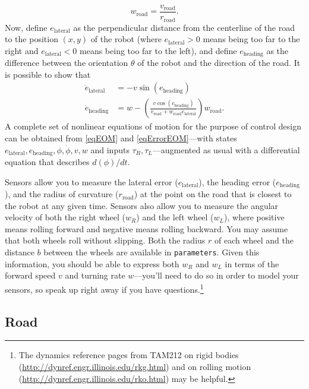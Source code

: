 \documentclass[12pt]{article}
\begin{document}
\begin{equation}
\label{eqCurvature}
w_\text{road} = \frac{v_\text{road}}{r_\text{road}}.
\end{equation}
Now, define $e_\text{lateral}$ as the perpendicular distance from the centerline of the road to the position $(x,y)$ of the robot (where $e_\text{lateral}>0$ means being too far to the right and $e_\text{lateral}<0$ means being too far to the left), and define $e_\text{heading}$ as the difference between the orientation $\theta$ of the robot and the direction of the road. It is possible to show that
\begin{equation}
\label{eqErrorEOM}
\begin{aligned}
\dot{e}_\text{lateral} &= -v\sin\left(e_\text{heading}\right) \\
\dot{e}_\text{heading} &= w-\left(\frac{v\cos\left(e_\text{heading}\right)}{v_\text{road}+w_\text{road}e_\text{lateral}}\right)w_\text{road}.
\end{aligned}
\end{equation}
A complete set of nonlinear equations of motion for the purpose of control design can be obtained from \eqref{eqEOM} and \eqref{eqErrorEOM}---with states $e_\text{lateral}, e_\text{heading}, \phi, \dot{\phi}, v, w$ and inputs $\tau_{R},\tau_{L}$---augmented as usual with a differential equation that describes $d(\phi)/dt$.

Sensors allow you to measure the lateral error ($e_\text{lateral}$), the heading error ($e_\text{heading}$), and the radius of curvature ($r_\text{road}$) at the point on the road that is closest to the robot at any given time. Sensors also allow you to measure the angular velocity of both the right wheel ($w_{R}$) and the left wheel ($w_{L}$), where positive means rolling forward and negative means rolling backward. You may assume that both wheels roll without slipping. Both the radius $r$ of each wheel and the distance $b$ between the wheels are available in \lstinline|parameters|. Given this information, you should be able to express both $w_{R}$ and $w_{L}$ in terms of the forward speed $v$ and turning rate $w$---you'll need to do so in order to model your sensors, so speak up right away if you have questions.\footnote{The dynamics reference pages from TAM212 on rigid bodies (\url{http://dynref.engr.illinois.edu/rkg.html}) and on rolling motion (\url{http://dynref.engr.illinois.edu/rko.html}) may be helpful.}

\subsection{Road}
\end{document}

